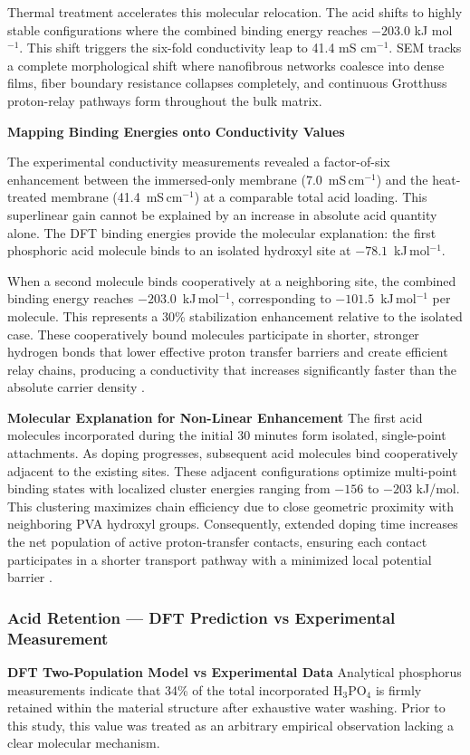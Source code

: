 \documentclass[12pt,a4paper]{report}
\begin{document}
Thermal treatment accelerates this molecular relocation. The acid shifts to highly stable configurations where the combined binding energy reaches \(-203.0\) kJ mol\(^{-1}\). This shift triggers the six-fold conductivity leap to 41.4 mS cm\(^{-1}\). SEM tracks a complete morphological shift where nanofibrous networks coalesce into dense films, fiber boundary resistance collapses completely, and continuous Grotthuss proton-relay pathways form throughout the bulk matrix.

\textbf{Mapping Binding Energies onto Conductivity Values}

The experimental conductivity measurements revealed a factor-of-six enhancement between the immersed-only membrane (7.0~mS\,cm$^{-1}$) and the heat-treated membrane (41.4~mS\,cm$^{-1}$) at a comparable total acid loading. This superlinear gain cannot be explained by an increase in absolute acid quantity alone. The DFT binding energies provide the molecular explanation: the first phosphoric acid molecule binds to an isolated hydroxyl site at \(-78.1\)~kJ\,mol$^{-1}$.

When a second molecule binds cooperatively at a neighboring site, the combined binding energy reaches \(-203.0\)~kJ\,mol$^{-1}$, corresponding to \(-101.5\)~kJ\,mol$^{-1}$ per molecule. This represents a 30\% stabilization enhancement relative to the isolated case. These cooperatively bound molecules participate in shorter, stronger hydrogen bonds that lower effective proton transfer barriers and create efficient relay chains, producing a conductivity that increases significantly faster than the absolute carrier density \cite{21,55,100}.

\textbf{Molecular Explanation for Non-Linear Enhancement}
The first acid molecules incorporated during the initial 30 minutes form isolated, single-point attachments. As doping progresses, subsequent acid molecules bind cooperatively adjacent to the existing sites. These adjacent configurations optimize multi-point binding states with localized cluster energies ranging from \(-156\) to \(-203\) kJ/mol. This clustering maximizes chain efficiency due to close geometric proximity with neighboring PVA hydroxyl groups. Consequently, extended doping time increases the net population of active proton-transfer contacts, ensuring each contact participates in a shorter transport pathway with a minimized local potential barrier \cite{21, 55, 100}.

\subsubsection{Acid Retention — DFT Prediction vs Experimental Measurement}
\textbf{DFT Two-Population Model vs Experimental Data}
Analytical phosphorus measurements indicate that 34\% of the total incorporated H\(_3\)PO\(_4\) is firmly retained within the material structure after exhaustive water washing. Prior to this study, this value was treated as an arbitrary empirical observation lacking a clear molecular mechanism. 
\end{document}

